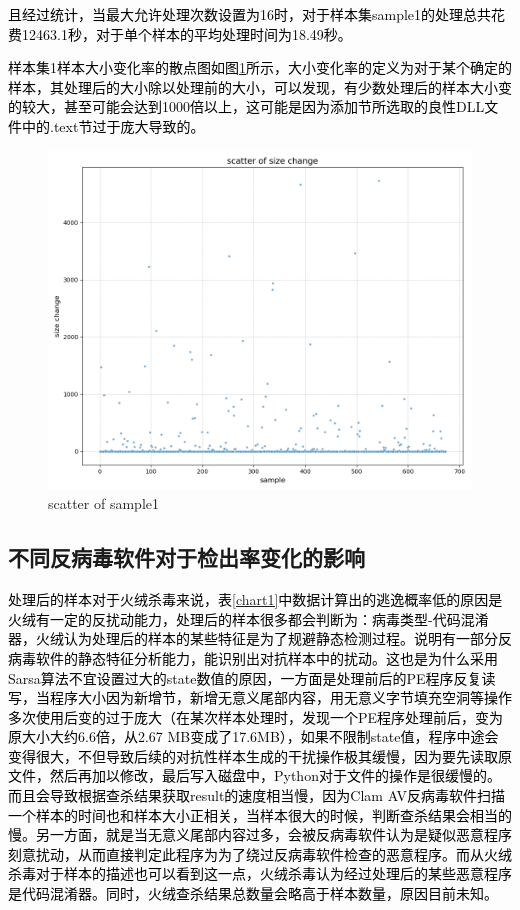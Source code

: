 \textcolor{black}{且经过统计，当最大允许处理次数设置为16时，对于样本集sample1的处理总共花费12463.1秒，对于单个样本的平均处理时间为18.49秒。}

\textcolor{black}{样本集1样本大小变化率的散点图如图\ref{fig:scatter_of_sample1}所示，大小变化率的定义为对于某个确定的样本，其处理后的大小除以处理前的大小，可以发现，有少数处理后的样本大小变的较大，甚至可能会达到1000倍以上，这可能是因为添加节所选取的良性DLL文件中的.text节过于庞大导致的。}

\begin{figure}
  \centering
  \includegraphics[scale=0.50]{images/scatter_of_sample1.png}
  \caption{scatter of sample1}\label{fig:scatter_of_sample1}
\end{figure}
\subsection{不同反病毒软件对于检出率变化的影响}

\textcolor{black}{处理后的样本对于火绒杀毒来说，表\ref{chart1}中数据计算出的逃逸概率低的原因是火绒有一定的反扰动能力，处理后的样本很多都会判断为：病毒类型-代码混淆器，火绒认为处理后的样本的某些特征是为了规避静态检测过程。说明有一部分反病毒软件的静态特征分析能力，能识别出对抗样本中的扰动。这也是为什么采用Sarsa算法不宜设置过大的state数值的原因，一方面是处理前后的PE程序反复读写，当程序大小因为新增节，新增无意义尾部内容，用无意义字节填充空洞等操作多次使用后变的过于庞大（在某次样本处理时，发现一个PE程序处理前后，变为原大小大约6.6倍，从2.67 MB变成了17.6MB），如果不限制state值，程序中途会变得很大，不但导致后续的对抗性样本生成的干扰操作极其缓慢，因为要先读取原文件，然后再加以修改，最后写入磁盘中，Python对于文件的操作是很缓慢的。而且会导致根据查杀结果获取result的速度相当慢，因为Clam AV反病毒软件扫描一个样本的时间也和样本大小正相关，当样本很大的时候，判断查杀结果会相当的慢。另一方面，就是当无意义尾部内容过多，会被反病毒软件认为是疑似恶意程序刻意扰动，从而直接判定此程序为为了绕过反病毒软件检查的恶意程序。而从火绒杀毒对于样本的描述也可以看到这一点，火绒杀毒认为经过处理后的某些恶意程序是代码混淆器。同时，火绒查杀结果总数量会略高于样本数量，原因目前未知。}

